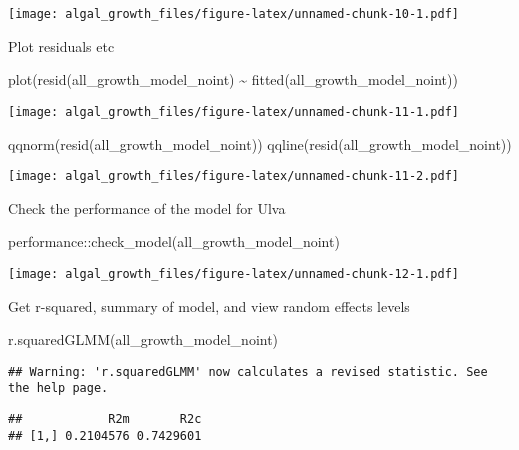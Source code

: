 \documentclass[
]{article}
\newenvironment{Shaded}{\begin{snugshade}}{\end{snugshade}}
\newcommand{\FunctionTok}[1]{\textcolor[rgb]{0.00,0.00,0.00}{#1}}
\newcommand{\NormalTok}[1]{#1}
\newcommand{\SpecialCharTok}[1]{\textcolor[rgb]{0.00,0.00,0.00}{#1}}
\begin{document}
\texttt{[image: algal\_growth\_files/figure-latex/unnamed-chunk-10-1.pdf]}

Plot residuals etc

\begin{Shaded}
\begin{Highlighting}[]
\FunctionTok{plot}\NormalTok{(}\FunctionTok{resid}\NormalTok{(all\_growth\_model\_noint) }\SpecialCharTok{\textasciitilde{}} \FunctionTok{fitted}\NormalTok{(all\_growth\_model\_noint))}
\end{Highlighting}
\end{Shaded}

\texttt{[image: algal\_growth\_files/figure-latex/unnamed-chunk-11-1.pdf]}

\begin{Shaded}
\begin{Highlighting}[]
\FunctionTok{qqnorm}\NormalTok{(}\FunctionTok{resid}\NormalTok{(all\_growth\_model\_noint))}
\FunctionTok{qqline}\NormalTok{(}\FunctionTok{resid}\NormalTok{(all\_growth\_model\_noint))}
\end{Highlighting}
\end{Shaded}

\texttt{[image: algal\_growth\_files/figure-latex/unnamed-chunk-11-2.pdf]}

Check the performance of the model for Ulva

\begin{Shaded}
\begin{Highlighting}[]
\NormalTok{performance}\SpecialCharTok{::}\FunctionTok{check\_model}\NormalTok{(all\_growth\_model\_noint)}
\end{Highlighting}
\end{Shaded}

\texttt{[image: algal\_growth\_files/figure-latex/unnamed-chunk-12-1.pdf]}

Get r-squared, summary of model, and view random effects levels

\begin{Shaded}
\begin{Highlighting}[]
\FunctionTok{r.squaredGLMM}\NormalTok{(all\_growth\_model\_noint)}
\end{Highlighting}
\end{Shaded}

\begin{verbatim}
## Warning: 'r.squaredGLMM' now calculates a revised statistic. See the help page.
\end{verbatim}

\begin{verbatim}
##            R2m       R2c
## [1,] 0.2104576 0.7429601
\end{verbatim}
\end{document}
